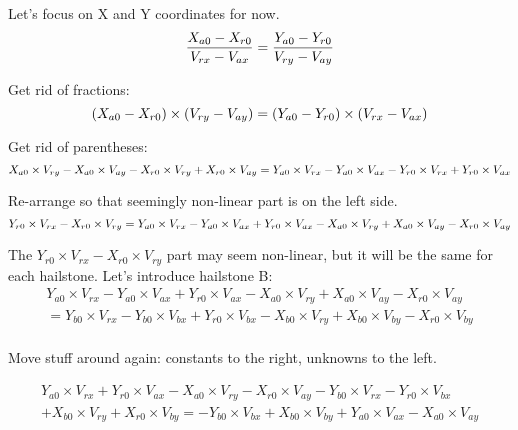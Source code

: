 \documentclass{article}
\begin{document}
Let's focus on X and Y coordinates for now.
\begin{displaymath}
    \frac{X_{a0} - X_{r0}}{V_{rx} - V_{ax}} = \frac{Y_{a0} - Y_{r0}}{V_{ry} - V_{ay}}\\
\end{displaymath}


Get rid of fractions:
\begin{displaymath}
    (X_{a0} - X_{r0}) \times (V_{ry} - V_{ay}) = (Y_{a0} - Y_{r0}) \times (V_{rx} - V_{ax})\\
\end{displaymath}

Get rid of parentheses:
\begin{displaymath}
    X_{a0} \times V_{ry} - X_{a0} \times V_{ay} - X_{r0} \times V_{ry} + X_{r0} \times V_{ay} = Y_{a0} \times V_{rx} - Y_{a0} \times V_{ax} - Y_{r0} \times V_{rx} + Y_{r0} \times V_{ax}\\
\end{displaymath}

Re-arrange so that seemingly non-linear part is on the left side.
\begin{displaymath}
    Y_{r0} \times V_{rx} - X_{r0} \times V_{ry} = Y_{a0} \times V_{rx} - Y_{a0} \times V_{ax} + Y_{r0} \times V_{ax} - X_{a0} \times V_{ry} + X_{a0} \times V_{ay} - X_{r0} \times V_{ay}\\
\end{displaymath}


The $Y_{r0} \times V_{rx} - X_{r0} \times V_{ry}$ part may seem non-linear, but it will be the same for each hailstone. Let's introduce
hailstone B:
\begin{displaymath}
    \begin{aligned}
    Y_{a0} \times V_{rx} - Y_{a0} \times V_{ax} + Y_{r0} \times V_{ax} - X_{a0} \times V_{ry} + X_{a0} \times V_{ay} - X_{r0} \times V_{ay}\\
  = Y_{b0} \times V_{rx} - Y_{b0} \times V_{bx} + Y_{r0} \times V_{bx} - X_{b0} \times V_{ry} + X_{b0} \times V_{by} - X_{r0} \times V_{by}\\
    \end{aligned}
\end{displaymath}

Move stuff around again: constants to the right, unknowns to the left.

\begin{displaymath}
    \begin{aligned}
        Y_{a0} \times V_{rx} + Y_{r0} \times V_{ax} - X_{a0} \times V_{ry} - X_{r0} \times V_{ay} - Y_{b0} \times V_{rx} - Y_{r0} \times V_{bx} \\
        + X_{b0} \times V_{ry} + X_{r0} \times V_{by} = - Y_{b0} \times V_{bx} + X_{b0} \times V_{by} + Y_{a0} \times V_{ax} - X_{a0} \times V_{ay}\\
    \end{aligned}
\end{displaymath}
\end{document}
